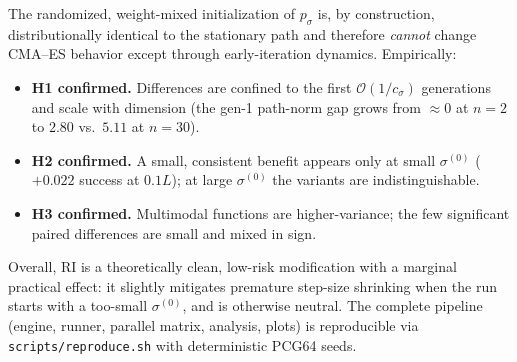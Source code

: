 \documentclass[11pt]{article}
\begin{document}
The randomized, weight-mixed initialization of $p_\sigma$ is, by construction, distributionally
identical to the stationary path and therefore \emph{cannot} change CMA--ES behavior except
through early-iteration dynamics. Empirically:
\begin{itemize}
\item \textbf{H1 confirmed.} Differences are confined to the first $\mathcal O(1/c_\sigma)$
generations and scale with dimension (the gen-1 path-norm gap grows from $\approx 0$ at $n=2$
to $2.80$ vs.\ $5.11$ at $n=30$).
\item \textbf{H2 confirmed.} A small, consistent benefit appears only at small $\sigma^{(0)}$
($+0.022$ success at $0.1L$); at large $\sigma^{(0)}$ the variants are indistinguishable.
\item \textbf{H3 confirmed.} Multimodal functions are higher-variance; the few significant
paired differences are small and mixed in sign.
\end{itemize}
Overall, RI is a theoretically clean, low-risk modification with a marginal practical effect:
it slightly mitigates premature step-size shrinking when the run starts with a too-small
$\sigma^{(0)}$, and is otherwise neutral. The complete pipeline (engine, runner, parallel
matrix, analysis, plots) is reproducible via \texttt{scripts/reproduce.sh} with deterministic
PCG64 seeds.
\end{document}
